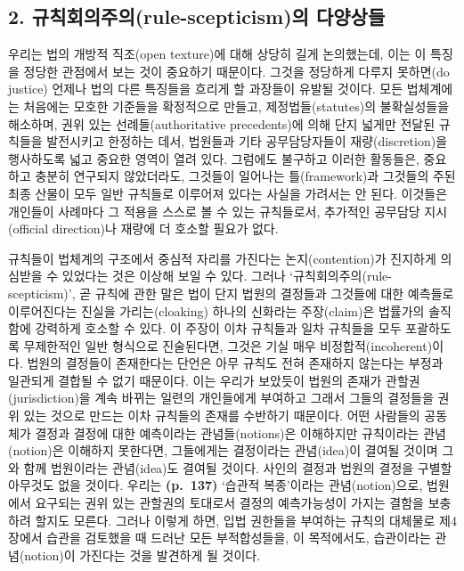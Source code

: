 \subsection{2. 규칙회의주의(rule-scepticism)의
다양상들}\label{uxaddcuxce59uxd68cuxc758uxc8fcuxc758rule-scepticismuxc758-uxb2e4uxc591uxc0c1uxb4e4}

우리는 법의 개방적 직조(open texture)에 대해 상당히 길게 논의했는데,
이는 이 특징을 정당한 관점에서 보는 것이 중요하기 때문이다. 그것을
정당하게 다루지 못하면(do justice) 언제나 법의 다른 특징들을 흐리게 할
과장들이 유발될 것이다. 모든 법체계에는 처음에는 모호한 기준들을
확정적으로 만들고, 제정법들(statutes)의 불확실성들을 해소하며, 권위 있는
선례들(authoritative precedents)에 의해 단지 넓게만 전달된 규칙들을
발전시키고 한정하는 데서, 법원들과 기타 공무담당자들이
재량(discretion)을 행사하도록 넓고 중요한 영역이 열려 있다. 그럼에도
불구하고 이러한 활동들은, 중요하고 충분히 연구되지 않았더라도, 그것들이
일어나는 틀(framework)과 그것들의 주된 최종 산물이 모두 일반 규칙들로
이루어져 있다는 사실을 가려서는 안 된다. 이것들은 개인들이 사례마다 그
적용을 스스로 볼 수 있는 규칙들로서, 추가적인 공무담당 지시(official
direction)나 재량에 더 호소할 필요가 없다.

규칙들이 법체계의 구조에서 중심적 자리를 가진다는 논지(contention)가
진지하게 의심받을 수 있었다는 것은 이상해 보일 수 있다. 그러나
‘규칙회의주의(rule-scepticism)’, 곧 규칙에 관한 말은 법이 단지 법원의
결정들과 그것들에 대한 예측들로 이루어진다는 진실을 가리는(cloaking)
하나의 신화라는 주장(claim)은 법률가의 솔직함에 강력하게 호소할 수 있다.
이 주장이 이차 규칙들과 일차 규칙들을 모두 포괄하도록 무제한적인 일반
형식으로 진술된다면, 그것은 기실 매우 비정합적(incoherent)이다. 법원의
결정들이 존재한다는 단언은 아무 규칙도 전혀 존재하지 않는다는 부정과
일관되게 결합될 수 없기 때문이다. 이는 우리가 보았듯이 법원의 존재가
관할권(jurisdiction)을 계속 바뀌는 일련의 개인들에게 부여하고 그래서
그들의 결정들을 권위 있는 것으로 만드는 이차 규칙들의 존재를 수반하기
때문이다. 어떤 사람들의 공동체가 결정과 결정에 대한 예측이라는
관념들(notions)은 이해하지만 규칙이라는 관념(notion)은 이해하지
못한다면, 그들에게는  결정이라는
관념(idea)이 결여될 것이며 그와 함께 법원이라는 관념(idea)도 결여될
것이다. 사인의 결정과 법원의 결정을 구별할 아무것도 없을 것이다. 우리는
\textbf{(p.~137)} ‘습관적 복종’이라는 관념(notion)으로, 법원에서
요구되는 권위 있는 관할권의 토대로서 결정의 예측가능성이 가지는 결함을
보충하려 할지도 모른다. 그러나 이렇게 하면, 입법 권한들을 부여하는
규칙의 대체물로 제4장에서 습관을 검토했을 때 드러난 모든 부적합성들을,
이 목적에서도, 습관이라는 관념(notion)이 가진다는 것을 발견하게 될
것이다.

